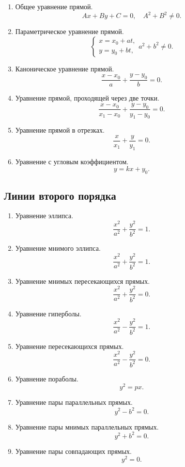 \documentclass[12pt]{report}
\theoremstyle{definition}
\begin{document}
\begin{enumerate}
\item Общее уравнение прямой.
  $$
    Ax + By + C = 0, \quad A^2 + B^2 \ne 0.
  $$
\item Параметрическое уравнение прямой.
  $$
  \begin{cases}
    x=x_0+at, \\
    y=y_0+bt,
  \end{cases}
  a^2 + b^2 \ne 0.
  $$
\item Каноническое уравнение прямой.
  $$
    \dfrac{x - x_0}{a} + \dfrac{y - y_0}{b} = 0.
  $$
\item Уравнение прямой, проходящей через две точки.
  $$
    \dfrac{x - x_0}{x_1 - x_0} + \dfrac{y - y_0}{y_1 - y_0} = 0.
  $$
\item Уравнение прямой в отрезках.
  $$
    \dfrac{x}{x_1} + \dfrac{y}{y_1} = 0.
  $$
\item Уравнение с угловым коэффициентом.
  $$
    y = kx + y_0.
  $$
\end{enumerate}

\subsection{Линии второго порядка}

\begin{enumerate}
\item Уравнение эллипса.
  $$
    \dfrac{x^2}{a^2} + \dfrac{y^2}{b^2} = 1.
  $$
\item Уравнение мнимого эллипса.
  $$
    \dfrac{x^2}{a^2} + \dfrac{y^2}{b^2} = 1.
  $$
\item Уравнение мнимых пересекающихся прямых.
  $$
    \dfrac{x^2}{a^2} + \dfrac{y^2}{b^2} = 0.
  $$
\item Уравнение гиперболы.
  $$
    \dfrac{x^2}{a^2} - \dfrac{y^2}{b^2} = 1.
  $$
\item Уравнение пересекающихся прямых.
  $$
    \dfrac{x^2}{a^2} - \dfrac{y^2}{b^2} = 0.
  $$
\item Уравнение пораболы.
  $$
    y^2 = px.
  $$
\item Уравнение пары параллельных прямых.
  $$
    y^2 - b^2 = 0.
  $$
\item Уравнение пары мнимых параллельных прямых.
  $$
    y^2 + b^2 = 0.
  $$
\item Уравнение пары совпадающих прямых.
  $$
    y^2 = 0.
  $$
\end{enumerate}

\end{document}
